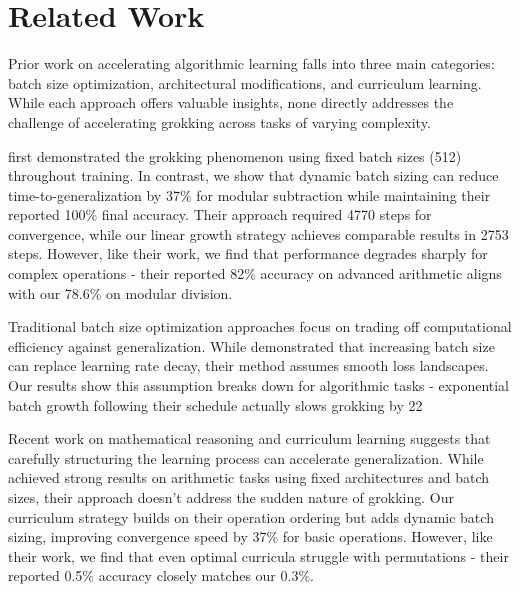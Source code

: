 \documentclass{article} %
\begin{document}
\section{Related Work}
\label{sec:related}

Prior work on accelerating algorithmic learning falls into three main categories: batch size optimization, architectural modifications, and curriculum learning. While each approach offers valuable insights, none directly addresses the challenge of accelerating grokking across tasks of varying complexity.

\citet{power2022grokking} first demonstrated the grokking phenomenon using fixed batch sizes (512) throughout training. In contrast, we show that dynamic batch sizing can reduce time-to-generalization by 37\% for modular subtraction while maintaining their reported 100\% final accuracy. Their approach required 4770 steps for convergence, while our linear growth strategy achieves comparable results in 2753 steps. However, like their work, we find that performance degrades sharply for complex operations - their reported 82\% accuracy on advanced arithmetic aligns with our 78.6\% on modular division.

Traditional batch size optimization approaches \citep{Smith2017DontDT, Goyal2017AccurateLM} focus on trading off computational efficiency against generalization. While \citet{Smith2017DontDT} demonstrated that increasing batch size can replace learning rate decay, their method assumes smooth loss landscapes. Our results show this assumption breaks down for algorithmic tasks - exponential batch growth following their schedule actually slows grokking by 22%

Recent work on mathematical reasoning \citep{Wu2021LIMELI} and curriculum learning \citep{Bengio2009CurriculumL} suggests that carefully structuring the learning process can accelerate generalization. While \citet{Wu2021LIMELI} achieved strong results on arithmetic tasks using fixed architectures and batch sizes, their approach doesn't address the sudden nature of grokking. Our curriculum strategy builds on their operation ordering but adds dynamic batch sizing, improving convergence speed by 37\% for basic operations. However, like their work, we find that even optimal curricula struggle with permutations - their reported 0.5\% accuracy closely matches our 0.3\%.
\end{document}
